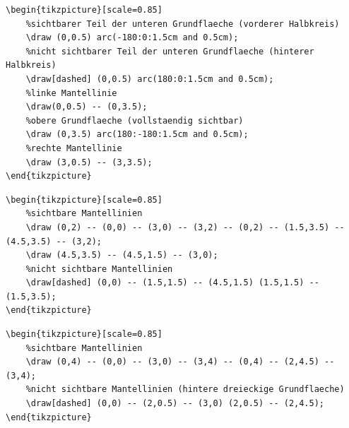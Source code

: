 \begin{lstlisting}[style=latex]
% Zylinder
\begin{tikzpicture}[scale=0.85]
	%sichtbarer Teil der unteren Grundflaeche (vorderer Halbkreis)
	\draw (0,0.5) arc(-180:0:1.5cm and 0.5cm);
	%nicht sichtbarer Teil der unteren Grundflaeche (hinterer Halbkreis)
	\draw[dashed] (0,0.5) arc(180:0:1.5cm and 0.5cm);
	%linke Mantellinie
	\draw(0,0.5) -- (0,3.5);
	%obere Grundflaeche (vollstaendig sichtbar)
	\draw (0,3.5) arc(180:-180:1.5cm and 0.5cm);
	%rechte Mantellinie
	\draw (3,0.5) -- (3,3.5);
\end{tikzpicture}
\end{lstlisting}

\begin{lstlisting}[style=latex]
% Quader
\begin{tikzpicture}[scale=0.85]
	%sichtbare Mantellinien
	\draw (0,2) -- (0,0) -- (3,0) -- (3,2) -- (0,2) -- (1.5,3.5) -- (4.5,3.5) -- (3,2);
	\draw (4.5,3.5) -- (4.5,1.5) -- (3,0);
	%nicht sichtbare Mantellinien
	\draw[dashed] (0,0) -- (1.5,1.5) -- (4.5,1.5) (1.5,1.5) -- (1.5,3.5);
\end{tikzpicture}
\end{lstlisting}

\begin{lstlisting}[style=latex]
% Dreiseitiges Prisma
\begin{tikzpicture}[scale=0.85]
	%sichtbare Mantellinien
	\draw (0,4) -- (0,0) -- (3,0) -- (3,4) -- (0,4) -- (2,4.5) -- (3,4);
	%nicht sichtbare Mantellinien (hintere dreieckige Grundflaeche)
	\draw[dashed] (0,0) -- (2,0.5) -- (3,0) (2,0.5) -- (2,4.5);
\end{tikzpicture}
\end{lstlisting}


